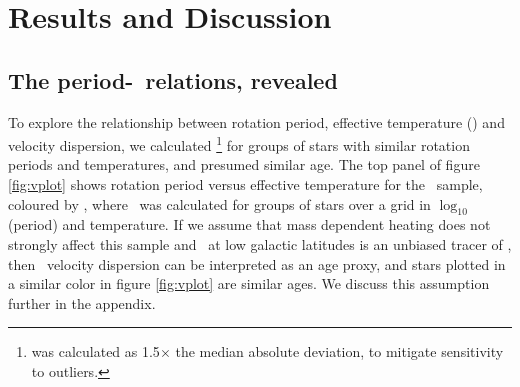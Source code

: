 \section{Results and Discussion}
\label{sec:results}

\subsection{The period-\teff\ relations, revealed}
\label{sec:the_reveal}

To explore the relationship between rotation period, effective temperature
(\teff ) and velocity dispersion, we calculated \sigmavb \footnote{\sigmavb
was calculated as 1.5$\times$ the median absolute deviation, to mitigate
sensitivity to outliers.} for groups of stars with similar rotation periods
and temperatures, and presumed similar age.
The top panel of figure \ref{fig:vplot} shows rotation period versus effective
temperature for the \mct\ sample, coloured by \sigmavb, where \sigmavb\ was
calculated for groups of stars over a grid in $\log_{10}$(period) and
temperature.
If we assume that mass dependent heating does not strongly affect this sample
and \vb\ at low galactic latitudes is an unbiased tracer of \vz, then \vb\
velocity dispersion can be interpreted as an age proxy, and stars plotted in a
similar color in figure \ref{fig:vplot} are similar ages.
We discuss this assumption further in the appendix.
